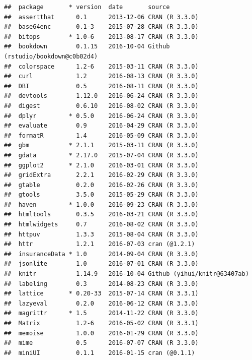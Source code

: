 \documentclass[]{book}
\begin{document}
\begin{verbatim}
##  package       * version  date       source                           
##  assertthat      0.1      2013-12-06 CRAN (R 3.3.0)                   
##  base64enc       0.1-3    2015-07-28 CRAN (R 3.3.0)                   
##  bitops        * 1.0-6    2013-08-17 CRAN (R 3.3.0)                   
##  bookdown        0.1.15   2016-10-04 Github (rstudio/bookdown@c0b02d4)
##  colorspace      1.2-6    2015-03-11 CRAN (R 3.3.0)                   
##  curl            1.2      2016-08-13 CRAN (R 3.3.0)                   
##  DBI             0.5      2016-08-11 CRAN (R 3.3.0)                   
##  devtools        1.12.0   2016-06-24 CRAN (R 3.3.0)                   
##  digest          0.6.10   2016-08-02 CRAN (R 3.3.0)                   
##  dplyr         * 0.5.0    2016-06-24 CRAN (R 3.3.0)                   
##  evaluate        0.9      2016-04-29 CRAN (R 3.3.0)                   
##  formatR         1.4      2016-05-09 CRAN (R 3.3.0)                   
##  gbm           * 2.1.1    2015-03-11 CRAN (R 3.3.0)                   
##  gdata         * 2.17.0   2015-07-04 CRAN (R 3.3.0)                   
##  ggplot2       * 2.1.0    2016-03-01 CRAN (R 3.3.0)                   
##  gridExtra       2.2.1    2016-02-29 CRAN (R 3.3.0)                   
##  gtable          0.2.0    2016-02-26 CRAN (R 3.3.0)                   
##  gtools          3.5.0    2015-05-29 CRAN (R 3.3.0)                   
##  haven         * 1.0.0    2016-09-23 CRAN (R 3.3.0)                   
##  htmltools       0.3.5    2016-03-21 CRAN (R 3.3.0)                   
##  htmlwidgets     0.7      2016-08-02 CRAN (R 3.3.0)                   
##  httpuv          1.3.3    2015-08-04 CRAN (R 3.3.0)                   
##  httr            1.2.1    2016-07-03 cran (@1.2.1)                    
##  insuranceData * 1.0      2014-09-04 CRAN (R 3.3.0)                   
##  jsonlite        1.0      2016-07-01 CRAN (R 3.3.0)                   
##  knitr           1.14.9   2016-10-04 Github (yihui/knitr@63407ab)     
##  labeling        0.3      2014-08-23 CRAN (R 3.3.0)                   
##  lattice       * 0.20-33  2015-07-14 CRAN (R 3.3.1)                   
##  lazyeval        0.2.0    2016-06-12 CRAN (R 3.3.0)                   
##  magrittr      * 1.5      2014-11-22 CRAN (R 3.3.0)                   
##  Matrix          1.2-6    2016-05-02 CRAN (R 3.3.1)                   
##  memoise         1.0.0    2016-01-29 CRAN (R 3.3.0)                   
##  mime            0.5      2016-07-07 CRAN (R 3.3.0)                   
##  miniUI          0.1.1    2016-01-15 cran (@0.1.1)                    

\end{verbatim}
\end{document}
